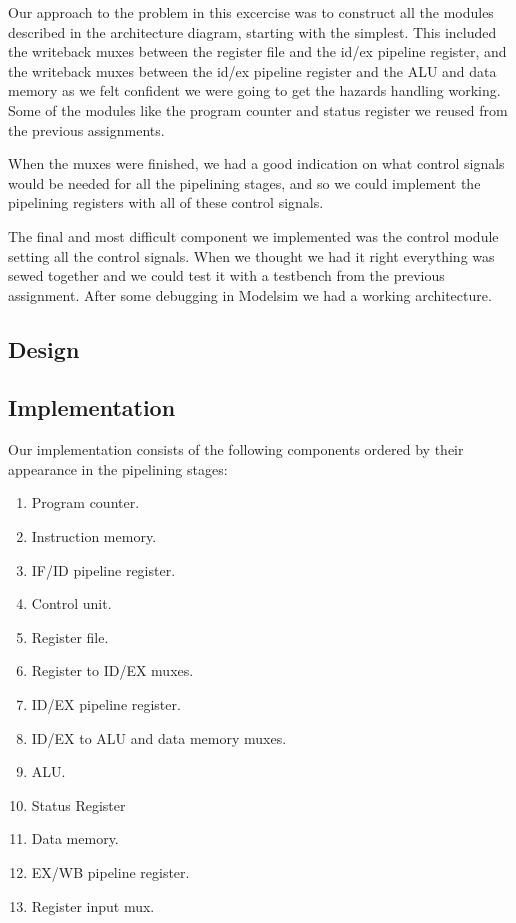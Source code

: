 \documentclass[11pt]{report}
\begin{document}
Our approach to the problem in this excercise was to construct all the 
modules described in the architecture diagram, starting with the simplest.  %
This included the writeback muxes between the register file and the id/ex
pipeline register, and the writeback muxes between the id/ex pipeline 
register and the ALU and data memory as we felt confident we were going 
to get the hazards handling working. 
Some of the modules like the program counter and status register 
we reused from the previous assignments.

When the muxes were finished, we had a good indication on what control
signals would be needed for all the pipelining stages, and so we could 
implement the pipelining registers with all of these control signals.

The final and most difficult component we implemented was the control
module setting all the control signals. When we thought we had it right
everything was sewed together and we could test it with a testbench
from the previous assignment. After some debugging in Modelsim we had 
a working architecture.

\subsection*{Design}


\subsection*{Implementation}

Our implementation consists of the following components
ordered by their appearance in the pipelining stages:
	
\begin{enumerate}
\item Program counter.
\item Instruction memory.
\item IF/ID pipeline register.
\item Control unit.
\item Register file.
\item Register to ID/EX muxes.
\item ID/EX pipeline register.
\item ID/EX to ALU and data memory muxes.
\item ALU.
\item Status Register
\item Data memory.
\item EX/WB pipeline register.
\item Register input mux.
\end{enumerate}
	
\end{document}
